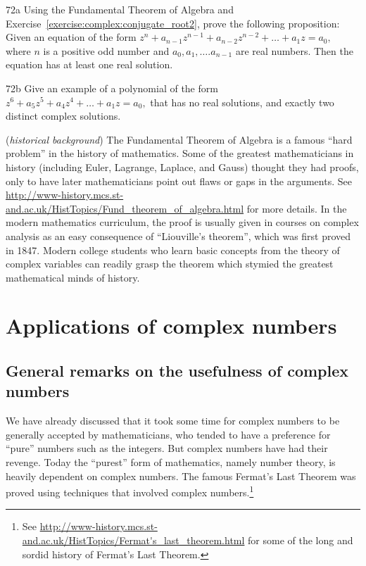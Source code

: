 \begin{exercise}{72a}
Using the Fundamental Theorem of Algebra and Exercise~\ref{exercise:complex:conjugate_root2}, prove the following proposition: 
Given an equation of the form $z^n + a_{n-1}z^{n-1} + a_{n-2} z^{n-2} + \ldots + a_1 z =a_0,$ where $n$ is a positive odd number and $a_0, a_1, \ldots. a_{n-1}$ are real numbers.  Then the equation has at least one real solution.
\end{exercise}


\begin{exercise}{72b}
Give an example of a polynomial of the form  $z^6 + a_{5}z^{5} + a_{4} z^{4} + \ldots + a_1 z =a_0,$ that has no real solutions, and exactly two distinct complex solutions.
\end{exercise}


\begin{rem} (\emph{historical background})
 The Fundamental Theorem of Algebra is a famous ``hard problem'' in the history of mathematics. Some of the greatest mathematicians in history (including Euler, Lagrange, Laplace, and Gauss) thought they had proofs, only to have later mathematicians point out flaws or gaps in the arguments. See \url{http://www-history.mcs.st-and.ac.uk/HistTopics/Fund_theorem_of_algebra.html} for more details. In the modern mathematics curriculum, the proof  is usually given in courses on complex analysis as an easy consequence of ``Liouville's theorem'', which was first proved in 1847. Modern college students who learn basic concepts from the theory of complex variables can readily grasp the theorem which stymied the greatest mathematical minds of history.
\end{rem}

\section{Applications of complex numbers\quad
{}}
\label{sec:ComplexNumbers:Application}

\subsection{General remarks on the usefulness of complex numbers}

We have already discussed that it took some time for complex numbers to be generally accepted by mathematicians, who tended to have a preference for ``pure'' numbers such as the integers. But complex numbers have had their revenge. Today the ``purest'' form of mathematics, namely number theory, is heavily dependent on complex numbers. The famous Fermat's Last Theorem was proved using techniques that involved complex numbers.\footnote{See \url{http://www-history.mcs.st-and.ac.uk/HistTopics/Fermat's_last_theorem.html} for some of the long and sordid history of Fermat's Last Theorem.}

